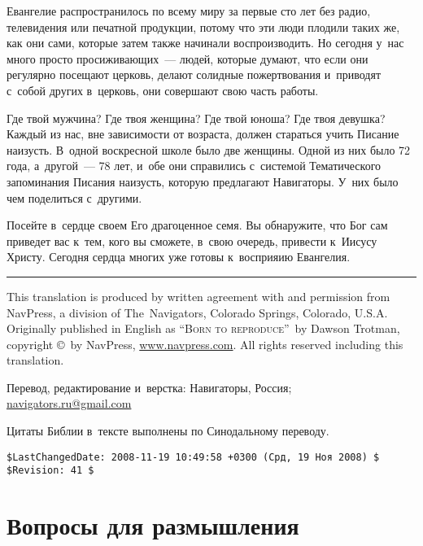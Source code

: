 \documentclass[12pt,article,a4paper,fittopage]{ncc}
\begin{document}
\begin{multicols}{2}
Евангелие распространилось по всему миру за первые сто лет без радио, телевидения или печатной продукции, потому что эти люди плодили таких же, как они сами, которые затем также начинали воспроизводить. Но сегодня у~нас много просто просиживающих~--- людей, которые думают, что если они регулярно посещают церковь, делают солидные пожертвования и~приводят с~собой других в~церковь, они совершают свою часть работы.

Где твой мужчина? Где твоя женщина? Где твой юноша? Где твоя девушка? Каждый из нас, вне зависимости от возраста, должен стараться учить Писание наизусть. В~одной воскресной школе было две женщины. Одной из них было 72 года, а~другой~--- 78 лет, и~обе они справились с~системой Тематического запоминания Писания наизусть, которую предлагают Навигаторы. У~них было чем поделиться с~другими.

Посейте в~сердце своем Его драгоценное семя. Вы обнаружите, что Бог сам приведет вас к~тем, кого вы сможете, в~свою очередь, привести к~Иисусу Христу. Сегодня сердца многих уже готовы к~восприяию Евангелия.

\thispagestyle{lheadings}

\end{multicols}

\hrule
\vspace{0.3cm}
\begin{footnotesize}
\noindent
This translation is produced by written agreement with and permission from NavPress, a division of The~Navigators, Colorado Springs, Colorado, U.S.A.  Originally published in English as \textsc{``Born to reproduce''}\ by Dawson Trotman, copyright \copyright\ by NavPress, \url{www.navpress.com}.  All rights reserved including this translation.

\vspace{0.2cm}
\noindent
Перевод, редактирование и~верстка: Навигаторы, Россия; \url{navigators.ru@gmail.com}

\vspace{0.2cm}
\noindent
Цитаты Библии в~тексте выполнены по Синодальному переводу.

\end{footnotesize}

{\tiny 
\begin{verbatim}
$LastChangedDate: 2008-11-19 10:49:58 +0300 (Срд, 19 Ноя 2008) $
$Revision: 41 $
\end{verbatim}

}
\newpage
\thispagestyle{empty}
\section*{Вопросы для размышления}
\end{document}
